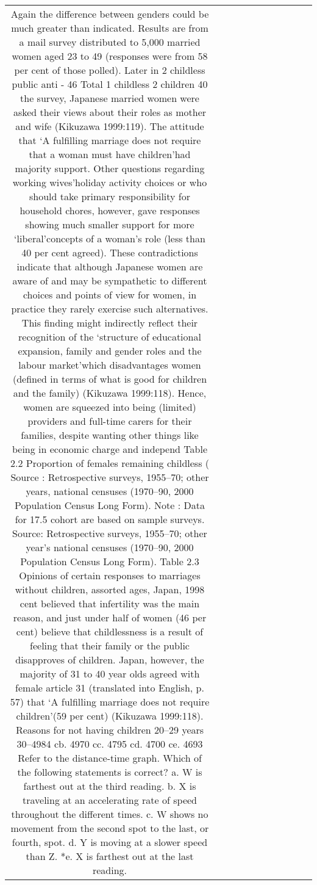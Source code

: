 \begin{table}[h!]
\begin{tabular}{|c|c|c|c|c|c|c|c|c|c|c|}
Again the difference between genders could be much greater than indicated. Results are from a mail survey distributed to 5,000 married women aged 23 to 49 (responses were from 58 per cent of those polled). Later in 2 childless public anti - 46%
Total 1 childless 2 children 40%
the survey, Japanese married women were asked their views about their roles as mother and wife (Kikuzawa 1999:119). The attitude that ‘A fulfilling marriage does not require that a woman must have children’had majority support. Other questions regarding working wives’holiday activity choices or who should take primary responsibility for household chores, however, gave responses showing much smaller support for more ‘liberal’concepts of a woman’s role (less than 40 per cent agreed). These contradictions indicate that although Japanese women are aware of and may be sympathetic to different choices and points of view for women, in practice they rarely exercise such alternatives.
This finding might indirectly reflect their recognition of the ‘structure of educational expansion, family and gender roles and the labour market’which disadvantages women (defined in terms of what is good for children and the family) (Kikuzawa 1999:118). Hence, women are squeezed into being (limited) providers and full-time carers for their families, despite wanting other things like being in economic charge and independ
Table 2.2 Proportion of females remaining childless (%
Source : Retrospective surveys, 1955–70; other years, national censuses (1970–90, 2000 Population Census Long Form). Note : Data for 17.5 cohort are based on sample surveys.
Source: Retrospective surveys, 1955–70; other year’s national censuses (1970–90, 2000 Population Census Long Form).
Table 2.3 Opinions of certain responses to marriages without children, assorted ages,
Japan, 1998
cent believed that infertility was the main reason, and just under half of women (46 per cent) believe that childlessness is a result of feeling that their family or the public disapproves of children.
Japan, however, the majority of 31 to 40 year olds agreed with female article 31 (translated into English, p. 57) that ‘A fulfilling marriage does not require children’(59 per cent) (Kikuzawa 1999:118).
Reasons for not having children 20–29 years 30–4984 cb. 4970 cc. 4795 cd. 4700 ce. 4693
Refer to the distance-time graph. Which of the following statements is correct? a. W is farthest out at the third reading. b. X is traveling at an accelerating rate of speed throughout the different times. c. W shows no movement from the second spot to the last, or fourth, spot. d. Y is moving at a slower speed than Z. *e. X is farthest out at the last reading.

\end{tabular}
\end{table}
